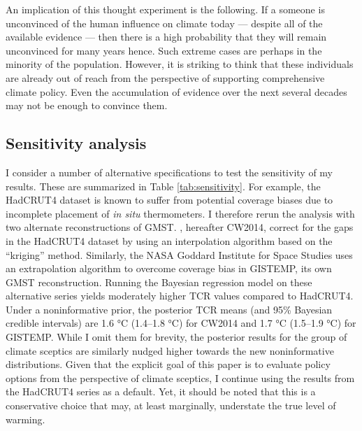 \documentclass[smallextended]{svjour3}       %
\begin{document}
An implication of this thought experiment is the following. If a someone
is unconvinced of the human influence on climate today --- despite all
of the available evidence --- then there is a high probability that they
will remain unconvinced for many years hence. Such extreme cases are
perhaps in the minority of the population. However, it is striking to
think that these individuals are already out of reach from the
perspective of supporting comprehensive climate policy. Even the
accumulation of evidence over the next several decades may not be enough
to convince them.

\hypertarget{sec:sensitivity}{%
\subsection{Sensitivity analysis}\label{sec:sensitivity}}

I consider a number of alternative specifications to test the
sensitivity of my results. These are summarized in Table
\ref{tab:sensitivity}. For example, the HadCRUT4 dataset is known to
suffer from potential coverage biases due to incomplete placement of
\textit{in situ} thermometers. I therefore rerun the analysis with two
alternate reconstructions of GMST. \cite{cowtan2014coverage}, hereafter
CW2014, correct for the gaps in the HadCRUT4 dataset by using an
interpolation algorithm based on the ``kriging'' method. Similarly, the
NASA Goddard Institute for Space Studies uses an extrapolation algorithm
to overcome coverage bias in GISTEMP, its own GMST reconstruction.
Running the Bayesian regression model on these alternative series yields
moderately higher TCR values compared to HadCRUT4. Under a
noninformative prior, the posterior TCR means (and 95\% Bayesian
credible intervals) are 1.6 °C (1.4--1.8 °C) for CW2014 and 1.7 °C
(1.5--1.9 °C) for GISTEMP. While I omit them for brevity, the posterior
results for the group of climate sceptics are similarly nudged higher
towards the new noninformative distributions. Given that the explicit
goal of this paper is to evaluate policy options from the perspective of
climate sceptics, I continue using the results from the HadCRUT4 series
as a default. Yet, it should be noted that this is a conservative choice
that may, at least marginally, understate the true level of warming.
\end{document}
